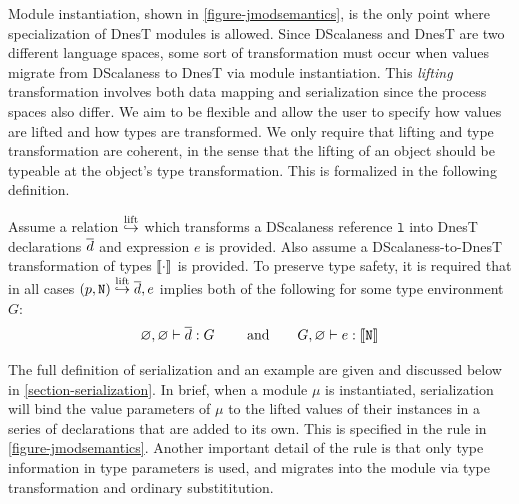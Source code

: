 Module instantiation, shown in \autoref{figure-jmodsemantics}, is the only point where
specialization of DnesT modules is allowed. Since DScalaness and DnesT are two different
language spaces, some sort of transformation must occur when values migrate from DScalaness to
DnesT via module instantiation. This \emph{lifting} transformation involves both data mapping
and serialization since the process spaces also differ. We aim to be flexible and allow the user
to specify how values are lifted and how types are transformed. We only require that lifting and
type transformation are coherent, in the sense that the lifting of an object should be typeable
at the object's type transformation. This is formalized in the following definition.
\begin{definition}
\label{def-lifting}
Assume a relation $\overset{\text{lift}}{\hookrightarrow}$ which transforms a DScalaness reference $\texttt{l}$ into DnesT
declarations $\overline{d}$ and expression $e$ is provided. Also assume a DScalaness-to-DnesT
transformation of types $\llbracket \cdot \rrbracket$ is provided. To preserve type safety, it is required that
in all cases $\mathtt{(}p,\mathtt{N)} \overset{\text{lift}}{\hookrightarrow} \overline{d}, e$ implies both of the following for some type
environment $G$:
$$
\varnothing, \varnothing \vdash \overline{d} : G \qquad \text{ and} \qquad
 G, \varnothing \vdash e : \llbracket \texttt{N} \rrbracket 
$$
\end{definition}
The full definition of serialization and an example are given and discussed below in
\autoref{section-serialization}. In brief, when a module $\mu$ is instantiated, serialization
will bind the value parameters of $\mu$ to the lifted values of their instances in a series of
declarations that are added to its own. This is specified in the  rule in
\autoref{figure-jmodsemantics}. Another important detail of the  rule is that
only type information in type parameters is used, and migrates into the module via type
transformation and ordinary substititution.

\jmodsemanticsfig

